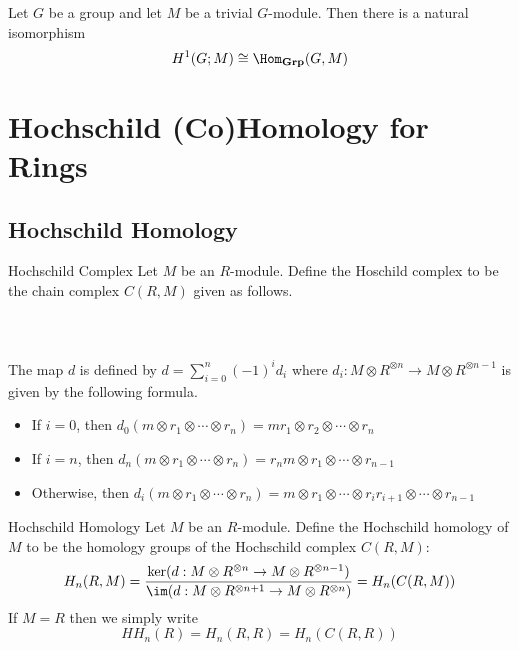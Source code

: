 \documentclass[a4paper]{article}
\begin{document}
\begin{crl}{}{} Let $G$ be a group and let $M$ be a trivial $G$-module. Then there is a natural isomorphism $$H^1(G;M)\cong\Hom_\bold{Grp}(G,M)$$
\end{crl}
\pagebreak


\pagebreak
\section{Hochschild (Co)Homology for Rings}
\subsection{Hochschild Homology}
\begin{defn}{Hochschild Complex}{} Let $M$ be an $R$-module. Define the Hoschild complex to be the chain complex $C(R,M)$ given as follows. \\~\\
\\~\\
The map $d$ is defined by $d=\sum_{i=0}^n(-1)^id_i$ where $d_i:M\otimes R^{\otimes n}\to M\otimes R^{\otimes n-1}$ is given by the following formula. 
\begin{itemize}
\item If $i=0$, then $d_0(m\otimes r_1\otimes\cdots\otimes r_n)=mr_1\otimes r_2\otimes\cdots\otimes r_n$
\item If $i=n$, then $d_n(m\otimes r_1\otimes\cdots\otimes r_n)=r_nm\otimes r_1\otimes\cdots\otimes r_{n-1}$
\item Otherwise, then $d_i(m\otimes r_1\otimes\cdots\otimes r_n)=m\otimes r_1\otimes\cdots\otimes r_ir_{i+1}\otimes \cdots\otimes r_{n-1}$
\end{itemize}
\end{defn}

\begin{defn}{Hochschild Homology}{} Let $M$ be an $R$-module. Define the Hochschild homology of $M$ to be the homology groups of the Hochschild complex $C(R,M)$: $$H_n(R,M)=\frac{\ker(d:M\otimes R^{\otimes n}\to M\otimes R^{\otimes n-1})}{\im(d:M\otimes R^{\otimes n+1}\to M\otimes R^{\otimes n})}=H_n(C(R,M))$$ If $M=R$ then we simply write $$HH_n(R)=H_n(R,R)=H_n(C(R,R))$$
\end{defn}
\end{document}
